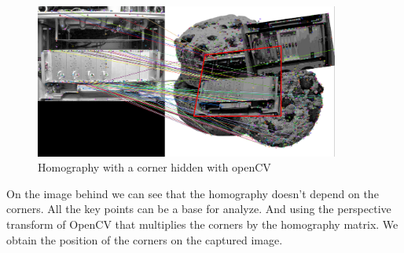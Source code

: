 	\begin{figure}
			\includegraphics[width=10cm]{images_not_compressed/showHomography.png}
			\caption{Homography with a corner hidden with openCV}
	\end{figure}
	\par On the image behind we can see that the homography doesn't depend on the corners. All the key points can be a base for analyze. And using the perspective transform of OpenCV that multiplies the corners by the homography matrix. We obtain the position of the corners on the captured image.
